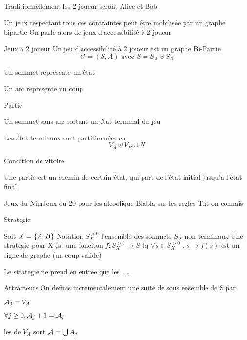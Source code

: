 \documentclass[a4paper,french,bookmarks]{article}
\begin{document}
    Traditionnellement les 2 joueur seront Alice et Bob

    Un jeux respectant tous ces contraintes peut être mobilisée par un graphe bipartie 
    On parle alors de jeux d'accessibilité à 2 joueur 
    
    \begin{definition}{Jeux a 2 joueur}{}
        Un jeu d'accessibilité à 2 joueur est un graphe Bi-Partie 
        \[ G = (S,A)  \text{ avec } S = S_A \uplus S_B \] 
        
        Un sommet represente un état 
        
        Un arc represente un coup 
        
    \end{definition}
    
    \begin{definition}{Partie}{}
        \begin{enumerate}
            
            \itast Un sommet sans arc sortant un état terminal du jeu 
            
            \itast Les état terminaux sont partitionnées en 
                \[ V_A \uplus V_B \uplus N  \]
                
            \itast Condition de vitoire 
            
            \itast Une partie est un chemin de certain état, qui part de l'état initial jusqu'a l'état final 
            
        \end{enumerate}
    \end{definition}
    
    
    \begin{example}{Jeux du Nim}{Jeux du 20 pour les alcoolique }
        Blabla sur les regles 
        Tkt on connais 
        
        
        
        Strategie
        
        Soit $X = \left\{A, B\right\}$
        Notation $S_X^{>0}$ l'ensemble des sommets $S_X$ non terminaux 
        Une strategie pour X est une fonciton $f: S_X^{>0} \to S$ tq 
        $\forall s \in S_X^{>0} $ , $ s \to f(s)$ est un signe de graphe  (un coup valide)
        
        
        Le strategie ne prend en entrée que les \dots \dots  
    \end{example}
    
    
    \begin{definition}{Attracteurs}{}
        On definis incrementalement une suite de sous ensemble de S par 
        \begin{enumerate}
            \itast $\mathcal{A}_0 = V_A$
            
            \itast $\forall j \geq 0, \mathcal{A}_j+1 = \mathcal{A}_j$
            
        \end{enumerate}
        
        les  de $V_A$ sont $\mathcal{A} = \bigcup A_j$
        
    \end{definition}
    
\end{document}
